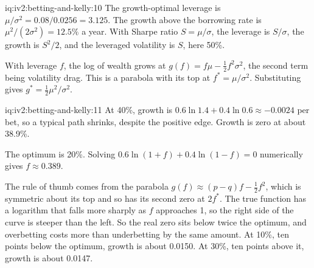 \begin{solution}{iq:iv2:betting-and-kelly:10}
The growth-optimal leverage is $\mu/\sigma^2 = 0.08/0.0256 = 3.125$. The growth above the borrowing rate is $\mu^2/(2\sigma^2) = 12.5\%$ a year. With Sharpe ratio $S = \mu/\sigma$, the leverage is $S/\sigma$, the growth is $S^2/2$, and the leveraged volatility is $S$, here 50\%.

With leverage $f$, the log of wealth grows at $g(f) = f\mu - \tfrac12 f^2\sigma^2$, the second term being volatility drag. This is a parabola with its top at $f^* = \mu/\sigma^2$. Substituting gives $g^* = \tfrac12\mu^2/\sigma^2$.

\end{solution}

\begin{solution}{iq:iv2:betting-and-kelly:11}
At 40\%, growth is $0.6\ln 1.4 + 0.4\ln 0.6 \approx -0.0024$ per bet, so a typical path shrinks, despite the positive edge. Growth is zero at about 38.9\%.

The optimum is 20\%. Solving $0.6\ln(1 + f) + 0.4\ln(1 - f) = 0$ numerically gives $f \approx 0.389$.

The rule of thumb comes from the parabola $g(f) \approx (p - q)f - \tfrac12 f^2$, which is symmetric about its top and so has its second zero at $2f^*$. The true function has a logarithm that falls more sharply as $f$ approaches 1, so the right side of the curve is steeper than the left. So the real zero sits below twice the optimum, and overbetting costs more than underbetting by the same amount. At 10\%, ten points below the optimum, growth is about 0.0150. At 30\%, ten points above it, growth is about 0.0147.

\end{solution}

